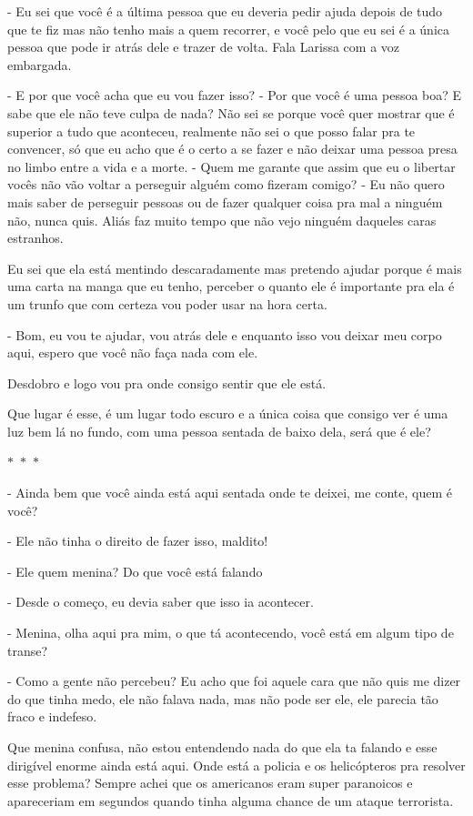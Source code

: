 - Eu sei que você é a última pessoa que eu deveria pedir ajuda depois de tudo que te fiz mas não tenho mais a quem recorrer, e  você pelo que eu sei é a única pessoa que pode ir atrás dele e trazer de volta. Fala Larissa com a voz embargada.

- E por que você acha que eu vou fazer isso?
- Por que você é uma pessoa boa? E sabe que ele não teve culpa de nada? Não sei se porque você quer mostrar que é superior a tudo que aconteceu, realmente não sei o que posso falar pra te convencer, só que eu acho que é o certo a se fazer e não deixar uma pessoa presa no limbo entre a vida e a morte.
- Quem me garante que assim que eu o libertar vocês não vão voltar a perseguir alguém como fizeram comigo?
- Eu não quero mais saber de perseguir pessoas ou de fazer qualquer coisa pra mal a ninguém não, nunca quis. Aliás faz muito tempo que não vejo ninguém daqueles caras estranhos.

Eu sei que ela está mentindo descaradamente mas pretendo ajudar porque é mais uma carta na manga que eu tenho, perceber o quanto ele é importante pra ela é um trunfo que com certeza vou poder usar na hora certa.

- Bom, eu vou te ajudar, vou atrás dele e enquanto isso vou deixar meu corpo aqui, espero que você não faça nada com ele.

Desdobro e logo vou pra onde consigo sentir que ele está.

Que lugar é esse, é um lugar todo escuro e a única coisa que consigo ver é uma luz bem lá no fundo, com uma pessoa sentada de baixo dela, será que é ele?

\begin{center}
	$\ast$~$\ast$~$\ast$
\end{center}

- Ainda bem que você ainda está aqui sentada onde te deixei, me conte, quem é você?

- Ele não tinha o direito de fazer isso, maldito!

- Ele quem menina? Do que você está falando

- Desde o começo, eu devia saber que isso ia acontecer.

- Menina, olha aqui pra mim, o que tá acontecendo, você está em algum tipo de transe?

- Como a gente não percebeu? Eu acho que foi aquele cara que não quis me dizer do que tinha medo, ele não falava nada, mas não pode ser ele, ele parecia tão fraco e indefeso.

Que menina confusa, não estou entendendo nada do que ela ta falando e esse dirigível enorme ainda está aqui. Onde está a policia e os helicópteros pra resolver esse problema? Sempre achei que os americanos eram super paranoicos e apareceriam em segundos quando tinha alguma chance de um ataque terrorista.

